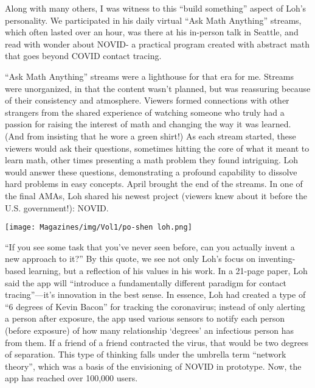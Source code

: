 \documentclass{article}
\begin{document}
\begin{multicols}{3}
Along with many others, I was witness to this “build something” aspect of Loh’s personality. We participated in his daily virtual “Ask Math Anything” streams, which often lasted over an hour, was there at his in-person talk in Seattle, and read with wonder about NOVID- a practical program created with abstract math that goes beyond COVID contact tracing.

“Ask Math Anything” streams were a lighthouse for that era for me. Streams were unorganized, in that the content wasn’t planned, but was reassuring because of their consistency and atmosphere. Viewers formed connections with other strangers from the shared experience of watching someone who truly had a passion for raising the interest of math and changing the way it was learned. (And from insisting that he wore a green shirt!) As each stream started, these viewers would ask their questions, sometimes hitting the core of what it meant to learn math, other times presenting a math problem they found intriguing. Loh would answer these questions, demonstrating a profound capability to dissolve hard problems in easy concepts. April brought the end of the streams. In one of the final AMAs, Loh shared his newest project (viewers knew about it before the U.S. government!): NOVID.
\begin{center}
    \texttt{[image: Magazines/img/Vol1/po-shen loh.png]}
\end{center}

“If you see some task that you’ve never seen before, can you actually invent a new approach to it?” By this quote, we see not only Loh’s focus on inventing-based learning, but a reflection of his values in his work. In a 21-page paper, Loh said the app will “introduce a fundamentally different paradigm for contact tracing”---it’s innovation in the best sense. In essence, Loh had created a type of “6 degrees of Kevin Bacon” for tracking the coronavirus; instead of only alerting a person after exposure, the app used various sensors to notify each person (before exposure) of how many relationship ‘degrees’ an infectious person has from them. If a friend of a friend contracted the virus, that would be two degrees of separation. This type of thinking falls under the umbrella term “network theory”, which was a basis of the envisioning of NOVID in prototype. Now, the app has reached over 100,000 users.


\end{multicols}
\end{document}
